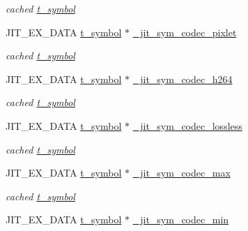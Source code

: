 \begin{DoxyCompactItemize}
\begin{DoxyCompactList}\small\item\em cached \hyperlink{structt__symbol}{t\_\-symbol} \item\end{DoxyCompactList}\item 
\hypertarget{group__jitter_gaeef3c7e6825664c9452860ec74dc5ce7}{
JIT\_\-EX\_\-DATA \hyperlink{structt__symbol}{t\_\-symbol} $\ast$ \hyperlink{group__jitter_gaeef3c7e6825664c9452860ec74dc5ce7}{\_\-jit\_\-sym\_\-codec\_\-pixlet}}
\label{group__jitter_gaeef3c7e6825664c9452860ec74dc5ce7}

\begin{DoxyCompactList}\small\item\em cached \hyperlink{structt__symbol}{t\_\-symbol} \item\end{DoxyCompactList}\item 
\hypertarget{group__jitter_ga22bf8afe704b694228d4a259cd096355}{
JIT\_\-EX\_\-DATA \hyperlink{structt__symbol}{t\_\-symbol} $\ast$ \hyperlink{group__jitter_ga22bf8afe704b694228d4a259cd096355}{\_\-jit\_\-sym\_\-codec\_\-h264}}
\label{group__jitter_ga22bf8afe704b694228d4a259cd096355}

\begin{DoxyCompactList}\small\item\em cached \hyperlink{structt__symbol}{t\_\-symbol} \item\end{DoxyCompactList}\item 
\hypertarget{group__jitter_ga34601164cb01bdbb7ba591f39c34b845}{
JIT\_\-EX\_\-DATA \hyperlink{structt__symbol}{t\_\-symbol} $\ast$ \hyperlink{group__jitter_ga34601164cb01bdbb7ba591f39c34b845}{\_\-jit\_\-sym\_\-codec\_\-lossless}}
\label{group__jitter_ga34601164cb01bdbb7ba591f39c34b845}

\begin{DoxyCompactList}\small\item\em cached \hyperlink{structt__symbol}{t\_\-symbol} \item\end{DoxyCompactList}\item 
\hypertarget{group__jitter_ga04f90d04943b23bdad24e41d17c3c44f}{
JIT\_\-EX\_\-DATA \hyperlink{structt__symbol}{t\_\-symbol} $\ast$ \hyperlink{group__jitter_ga04f90d04943b23bdad24e41d17c3c44f}{\_\-jit\_\-sym\_\-codec\_\-max}}
\label{group__jitter_ga04f90d04943b23bdad24e41d17c3c44f}

\begin{DoxyCompactList}\small\item\em cached \hyperlink{structt__symbol}{t\_\-symbol} \item\end{DoxyCompactList}\item 
\hypertarget{group__jitter_ga6c2610ea6ff28d44ffd36debb68592e5}{
JIT\_\-EX\_\-DATA \hyperlink{structt__symbol}{t\_\-symbol} $\ast$ \hyperlink{group__jitter_ga6c2610ea6ff28d44ffd36debb68592e5}{\_\-jit\_\-sym\_\-codec\_\-min}}
\label{group__jitter_ga6c2610ea6ff28d44ffd36debb68592e5}


\end{DoxyCompactItemize}
